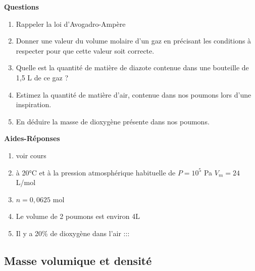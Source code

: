 \documentclass[
]{book}
\providecommand{\tightlist}{%
  \setlength{\itemsep}{0pt}\setlength{\parskip}{0pt}}
\def\tightlist{}
\begin{document}
\begin{blackbox}

\begin{center}
\textbf{Questions}

\end{center}

\begin{enumerate}
\def\labelenumi{\arabic{enumi}.}
\tightlist
\item
  Rappeler la loi d'Avogadro-Ampère
\item
  Donner une valeur du volume molaire d'un gaz en précisant les conditions à respecter pour que cette valeur soit correcte.
\item
  Quelle est la quantité de matière de diazote contenue dans une bouteille de 1,5 L de ce gaz ?
\item
  Estimez la quantité de matière d'air, contenue dans nos poumons lors d'une inspiration.
\item
  En déduire la masse de dioxygène présente dans nos poumons.
\end{enumerate}

\end{blackbox}

\textbf{Aides-Réponses}

\begin{enumerate}
\def\labelenumi{\arabic{enumi}.}
\tightlist
\item
  voir cours
\item
  à 20°C et à la pression atmosphérique habituelle de \(P=10^5\) Pa \(V_m=24\) L/mol
\item
  \(n=0,0625\) mol
\item
  Le volume de 2 poumons est environ 4L
\item
  Il y a 20\% de dioxygène dans l'air
  :::
\end{enumerate}

\hypertarget{masse-volumique-et-densituxe9}{%
\subsection{Masse volumique et densité}\label{masse-volumique-et-densituxe9}}
\end{document}
